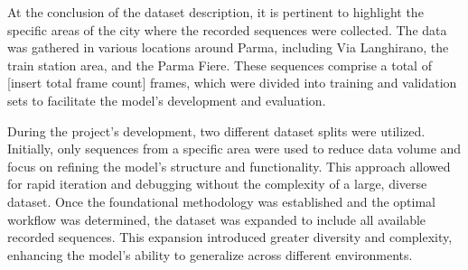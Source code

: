 At the conclusion of the dataset description, it is pertinent to highlight the specific areas of the city where the recorded sequences were collected. The data was gathered in various locations around Parma, including Via Langhirano, the train station area, and the Parma Fiere. These sequences comprise a total of [insert total frame count] frames, which were divided into training and validation sets to facilitate the model's development and evaluation.

During the project's development, two different dataset splits were utilized. Initially, only sequences from a specific area were used to reduce data volume and focus on refining the model's structure and functionality. This approach allowed for rapid iteration and debugging without the complexity of a large, diverse dataset. Once the foundational methodology was established and the optimal workflow was determined, the dataset was expanded to include all available recorded sequences. This expansion introduced greater diversity and complexity, enhancing the model's ability to generalize across different environments.


